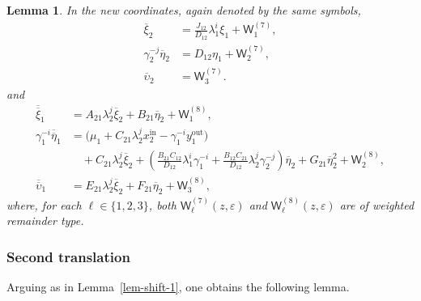 \documentclass[11pt,a4paper]{article}
\theoremstyle{plain}
\newtheorem{lemma}[theorem]{Lemma}
\theoremstyle{definition}
\theoremstyle{plain}
\numberwithin{equation}{section}
\begin{document}
\begin{lemma}
\label{lem-triangularization}
In the new coordinates, again denoted by the same symbols,
\begin{equation}
\label{eq-FLGdiag3}
\begin{aligned}
\overline{\xi}_2
&=
\frac{J_{12}}{D_{12}}\lambda_1^i \xi_1
+
\mathsf{W}_1^{(7)},
\\
\gamma_2^{-j}\overline{\eta}_2
&=
D_{12}\eta_1
+
\mathsf{W}_2^{(7)},
\\
\overline{\upsilon}_2
&=
\mathsf{W}_3^{(7)}.
\end{aligned}
\end{equation}
and
\begin{equation}
\label{eq-SLGdiag}
\begin{aligned}
\overline{\overline{\xi}}_1
&=
A_{21} \lambda_2^j \overline{\xi}_2 + B_{21}\overline{\eta}_2
+
\mathsf{W}_1^{(8)},
\\
\gamma_1^{-i} \overline{\overline{\eta}}_1
&=
\bigl(
\mu_1
+
C_{21} \lambda_2^j x_2^\mathrm{in}
-
\gamma_1^{-i} y_1^\mathrm{out}
\bigr) \\
&\quad +
C_{21} \lambda_2^j \overline{\xi}_2
+
\left( \frac{B_{21} C_{12}}{D_{12}} \lambda_1^i \gamma_1^{-i}  + \frac{B_{12} C_{21}}{D_{12}} \lambda_2^j \gamma_2^{-j} \right) \overline{\eta}_2
+
G_{21} \overline{\eta}_2^2
+
\mathsf{W}_2^{(8)},
\\
\overline{\overline{\upsilon}}_1
&=
E_{21} \lambda_2^j \overline{\xi}_2 + F_{21}\overline{\eta}_2
+
\mathsf{W}_3^{(8)},
\end{aligned}
\end{equation}
where, for each $\ell \in \{1,2,3\}$, both $\mathsf{W}_\ell^{(7)}(z, \varepsilon)$ and $\mathsf{W}_\ell^{(8)}(z, \varepsilon)$ are of weighted remainder type.
\end{lemma}

\subsubsection{Second translation}
Arguing as in Lemma~\ref{lem-shift-1}, one obtains the following lemma.
\end{document}
